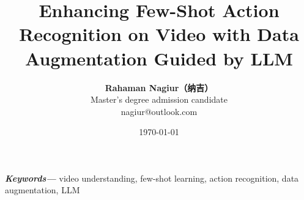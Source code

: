\documentclass[12pt]{article}
\providecommand{\keywords}[1]
{
  \small	
  \textbf{\textit{Keywords---}} #1
}
\begin{document}
\titleformat{\title}[block]{\Large\bfseries}{\thetitle}{1em}{}
\titlespacing*{\title}{60pt}{50pt}{\fill} 

\title{Enhancing Few-Shot Action Recognition on Video with Data Augmentation Guided by LLM\\
\large\textit{}} 

\begin{CJK*}{UTF8}{gbsn}
\author{\textbf{Rahaman Nagiur（纳吉）} \\ Master's degree admission candidate \\ nagiur@outlook.com}
\date{\today}

\maketitle




\keywords{video understanding, few-shot learning, action recognition, data augmentation, LLM}











 


\end{CJK*}
\end{document}
